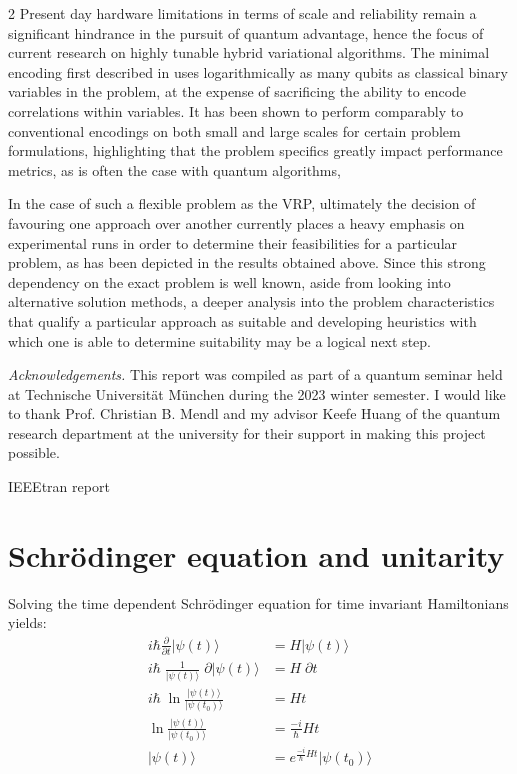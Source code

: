\documentclass [10pt]{article}
\newcommand {\qvec}[1] {\vert #1 \rangle}
\begin{document}
\begin {multicols}{2}
Present day hardware limitations in terms of scale and reliability remain a
significant hindrance in the pursuit of quantum advantage, hence the focus
of current research on  highly tunable hybrid variational algorithms. The
minimal encoding first described in \cite{effbinopt} uses logarithmically as
many qubits as classical binary variables in the problem, at the expense of
sacrificing the ability to encode correlations within variables. It has been
shown \cite{effvrp} to perform comparably to conventional encodings on both
small and large scales for certain problem formulations, highlighting that the
problem specifics greatly impact performance metrics, as is often the case
with quantum algorithms,

In the case of such a flexible problem as the VRP, ultimately the decision of
favouring one approach over another currently places a heavy emphasis on
experimental runs in order to determine their feasibilities for a particular
problem, as has been depicted in the results obtained above. Since this strong
dependency on the exact problem is well known, aside from looking into
alternative solution methods, a deeper analysis into the problem
characteristics that qualify a particular approach as suitable and developing
heuristics with which one is able to determine suitability may be a logical
next step.


\textit{Acknowledgements.}
This report was compiled as part of a quantum seminar held
at Technische Universität München during the 2023 winter semester. I would
like to thank Prof. Christian B. Mendl and my advisor Keefe Huang of the 
quantum research department at the university for their support in making
this project possible.

 {IEEEtran}
 {report}

\appendix

\section {Schrödinger equation and unitarity}
\label {schrodinger}

Solving the time dependent Schrödinger equation for time invariant
Hamiltonians yields:
\begin {equation*}
\begin {aligned}
i \hbar \frac{\partial}{\partial t} \qvec{\psi(t)} &= H \qvec{\psi(t)} \\
i \hbar \; \frac{1}{\qvec{\psi(t)}} \; \partial \qvec{\psi(t)}
&= H \; \partial t \\
i \hbar \; \ln \frac{\qvec{\psi(t)}}{\qvec{\psi(t_0)}} &= Ht \\
\ln \frac{\qvec{\psi(t)}}{\qvec{\psi(t_0)}} &= \frac{-i}{\hbar}Ht \\
\qvec{\psi(t)} &= e^{\frac{-i}{\hbar}Ht} \qvec{\psi(t_0)} \\
\end {aligned}
\end {equation*}


\end{multicols}
\end{document}
